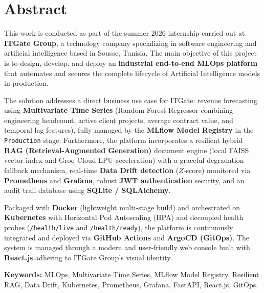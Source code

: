 \documentclass[11pt,a4paper,oneside]{report}
\begin{document}
\vspace{0.35cm}
\section*{Abstract}

This work is conducted as part of the summer 2026 internship carried out at \textbf{ITGate Group}, a technology company specializing in software engineering and artificial intelligence based in Sousse, Tunisia. The main objective of this project is to design, develop, and deploy an \textbf{industrial end-to-end MLOps platform} that automates and secures the complete lifecycle of Artificial Intelligence models in production.

The solution addresses a direct business use case for ITGate: revenue forecasting using \textbf{Multivariate Time Series} (Random Forest Regressor combining engineering headcount, active client projects, average contract value, and temporal lag features), fully managed by the \textbf{MLflow Model Registry} in the \texttt{Production} stage. Furthermore, the platform incorporates a resilient hybrid \textbf{RAG (Retrieval-Augmented Generation)} document engine (local FAISS vector index and Groq Cloud LPU acceleration) with a graceful degradation fallback mechanism, real-time \textbf{Data Drift detection} ($Z$-score) monitored via \textbf{Prometheus} and \textbf{Grafana}, robust \textbf{JWT authentication} security, and an audit trail database using \textbf{SQLite / SQLAlchemy}.

Packaged with \textbf{Docker} (lightweight multi-stage build) and orchestrated on \textbf{Kubernetes} with Horizontal Pod Autoscaling (HPA) and decoupled health probes (\texttt{/health/live} and \texttt{/health/ready}), the platform is continuously integrated and deployed via \textbf{GitHub Actions} and \textbf{ArgoCD (GitOps)}. The system is managed through a modern and user-friendly web console built with \textbf{React.js} adhering to ITGate Group's visual identity.

\vspace{0.25cm}
\textbf{Keywords:} MLOps, Multivariate Time Series, MLflow Model Registry, Resilient RAG, Data Drift, Kubernetes, Prometheus, Grafana, FastAPI, React.js, GitOps.

\newpage

\tableofcontents
\newpage

\listoffigures
{}
\end{document}

